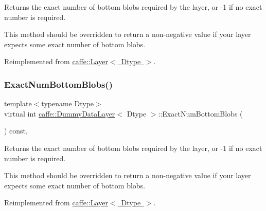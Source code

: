 Returns the exact number of bottom blobs required by the layer, or -\/1 if no exact number is required. 

This method should be overridden to return a non-\/negative value if your layer expects some exact number of bottom blobs. 

Reimplemented from \mbox{\hyperlink{classcaffe_1_1_layer_a8e5ee0494d85f5f55fc4396537cbc60f}{caffe\+::\+Layer$<$ Dtype $>$}}.

\mbox{\label{classcaffe_1_1_dummy_data_layer_a73101a8ace6de2b179e36c13be17cb17}} 
\subsubsection{\texorpdfstring{Exact\+Num\+Bottom\+Blobs()}{ExactNumBottomBlobs()}\hspace{0.1cm}{\footnotesize\ttfamily [2/2]}}
{\footnotesize\ttfamily template$<$typename Dtype$>$ \\
virtual int \mbox{\hyperlink{classcaffe_1_1_dummy_data_layer}{caffe\+::\+Dummy\+Data\+Layer}}$<$ Dtype $>$\+::Exact\+Num\+Bottom\+Blobs (\begin{DoxyParamCaption}{ }\end{DoxyParamCaption}) const\hspace{0.3cm}{\ttfamily [inline]}, {\ttfamily [virtual]}}



Returns the exact number of bottom blobs required by the layer, or -\/1 if no exact number is required. 

This method should be overridden to return a non-\/negative value if your layer expects some exact number of bottom blobs. 

Reimplemented from \mbox{\hyperlink{classcaffe_1_1_layer_a8e5ee0494d85f5f55fc4396537cbc60f}{caffe\+::\+Layer$<$ Dtype $>$}}.

\mbox{\label{classcaffe_1_1_dummy_data_layer_a43b495bfead8d18bf1d8eaf7bf91e3e4}} 
